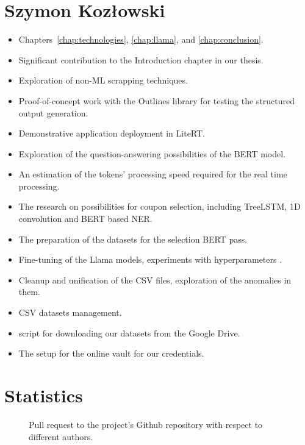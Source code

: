 \documentclass[licencjacka,en]{pracamgr}
\let\cleardoublepage\clearpage
\begin{document}
\section{Szymon Kozłowski}
\begin{itemize}
    \item Chapters~\ref{chap:technologies}, \ref{chap:llama}, and \ref{chap:conclusion}.
    \item Significant contribution to the Introduction chapter in our thesis.
    \item Exploration of non-ML scrapping techniques.
    \item Proof-of-concept work with the Outlines library for testing the structured output generation.
    \item Demonstrative application deployment in LiteRT.
    \item Exploration of the question-answering possibilities of the BERT model.
    \item An estimation of the tokens' processing speed required for the real time processing.
    \item The research on possibilities for coupon selection, including TreeLSTM, 1D convolution and BERT based NER.
    \item The preparation of the datasets for the selection BERT pass.
    \item Fine-tuning of the Llama models, experiments with hyperparameters .
    \item Cleanup and unification of the CSV files, exploration of the anomalies in them.
    \item CSV datasets management.
    \item script for downloading our datasets from the Google Drive.
    \item The setup for the online vault for our credentials.

\end{itemize}
\section{Statistics}

\begin{figure}[htbp]
\centering
{}
\caption{Pull request to the project's Github repository with respect to different authors.}
\label{fig:pr_contrib}
\end{figure}
\let\cleardoublepage\clearpage
\end{document}

